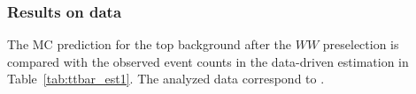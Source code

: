 



\subsubsection{Results on data}
The MC prediction for the top background after the $WW$ preselection 
is compared with the observed event counts in the data-driven estimation
in Table~\ref{tab:ttbar_est1}. The analyzed data correspond to \intlumi.

